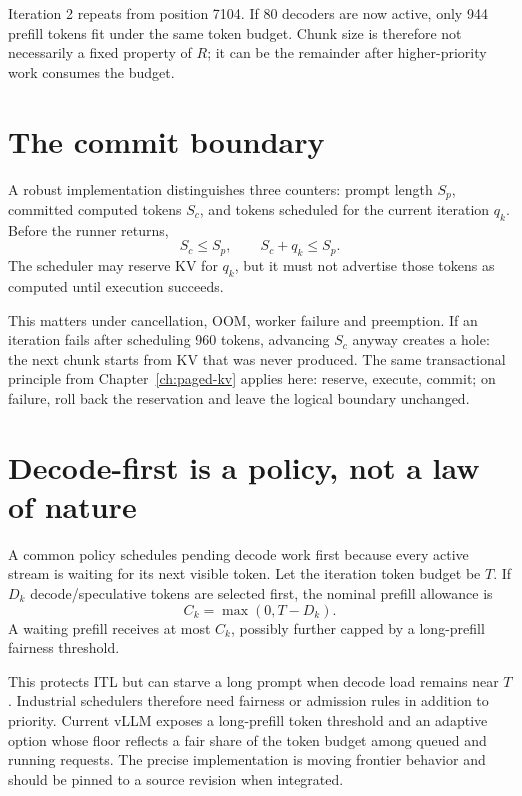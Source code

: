 Iteration 2 repeats from position 7104. If 80 decoders are now active, only 944
prefill tokens fit under the same token budget. Chunk size is therefore not
necessarily a fixed property of $R$; it can be the remainder after higher-priority
work consumes the budget.


\section{The commit boundary}

A robust implementation distinguishes three counters: prompt length $S_p$, committed
computed tokens $S_c$, and tokens scheduled for the current iteration $q_k$. Before
the runner returns,
\[
S_c \le S_p,\qquad S_c+q_k\le S_p.
\]
The scheduler may reserve KV for $q_k$, but it must not advertise those tokens as
computed until execution succeeds.

This matters under cancellation, OOM, worker failure and preemption. If an iteration
fails after scheduling 960 tokens, advancing $S_c$ anyway creates a hole: the next
chunk starts from KV that was never produced. The same transactional principle from
Chapter~\ref{ch:paged-kv} applies here: reserve, execute, commit; on failure, roll back
the reservation and leave the logical boundary unchanged.

\section{Decode-first is a policy, not a law of nature}

A common policy schedules pending decode work first because every active stream is
waiting for its next visible token. Let the iteration token budget be $T$. If $D_k$
decode/speculative tokens are selected first, the nominal prefill allowance is
\begin{equation}
C_k=\max(0,T-D_k).
\label{eq:remaining-budget}
\end{equation}
A waiting prefill receives at most $C_k$, possibly further capped by a long-prefill
fairness threshold.

This protects ITL but can starve a long prompt when decode load remains near $T$.
Industrial schedulers therefore need fairness or admission rules in addition to
priority. Current vLLM exposes a long-prefill token threshold and an adaptive option
whose floor reflects a fair share of the token budget among queued and running
requests. The precise implementation is moving frontier behavior and should be pinned
to a source revision when integrated.

